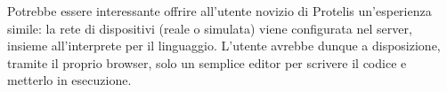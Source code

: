   Potrebbe essere interessante offrire all'utente novizio di Protelis un'esperienza simile:
  la rete di dispositivi (reale o simulata) viene configurata nel server, insieme all'interprete per il linguaggio.
  L'utente avrebbe dunque a disposizione, tramite il proprio browser, solo un semplice editor per scrivere il codice e metterlo in esecuzione.
